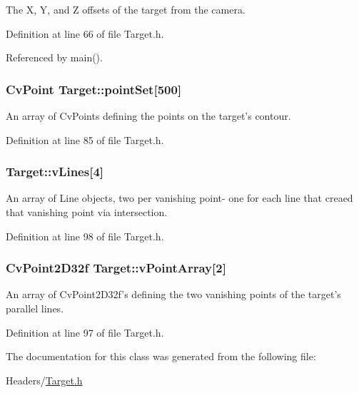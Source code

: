 The X, Y, and Z offsets of the target from the camera. 



Definition at line 66 of file Target.h.



Referenced by main().

\hypertarget{classTarget_a8cdd69bb1321e6928fcdfaf6959e5fe2}{
\subsubsection[{pointSet}]{\setlength{\rightskip}{0pt plus 5cm}CvPoint {\bf Target::pointSet}\mbox{[}500\mbox{]}}}
\label{classTarget_a8cdd69bb1321e6928fcdfaf6959e5fe2}


An array of CvPoints defining the points on the target's contour. 



Definition at line 85 of file Target.h.

\hypertarget{classTarget_a5a19c47a5b28c7e2a1d2b2cb24b322a1}{
\subsubsection[{vLines}]{ {\bf Target::vLines}\mbox{[}4\mbox{]}}}
\label{classTarget_a5a19c47a5b28c7e2a1d2b2cb24b322a1}


An array of Line objects, two per vanishing point-\/ one for each line that creaed that vanishing point via intersection. 



Definition at line 98 of file Target.h.

\hypertarget{classTarget_a55d4dc8c3f14d8229ee0d05fcebe0b42}{
\subsubsection[{vPointArray}]{\setlength{\rightskip}{0pt plus 5cm}CvPoint2D32f {\bf Target::vPointArray}\mbox{[}2\mbox{]}}}
\label{classTarget_a55d4dc8c3f14d8229ee0d05fcebe0b42}


An array of CvPoint2D32f's defining the two vanishing points of the target's parallel lines. 



Definition at line 97 of file Target.h.



The documentation for this class was generated from the following file:\begin{DoxyCompactItemize}
\item 
Headers/\hyperlink{Target_8h}{Target.h}\end{DoxyCompactItemize}
